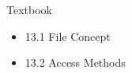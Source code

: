\begin{slide}

	
	\inputminted{c}{f1.c}

\end{slide}

\begin{slide}

	
	\inputminted{c}{f2.c}

\end{slide}

\begin{slide}

	
	\inputminted{c}{f3_ppt.c}

\end{slide}

\begin{slide}


    Textbook 
    \begin{itemize}
        \item 13.1 File Concept
        \item 13.2 Access Methods
    \end{itemize}
\end{slide}

